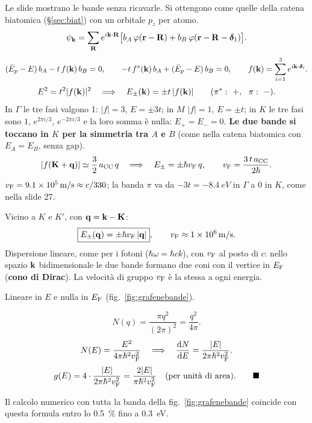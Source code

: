 \documentclass[11pt,a4paper]{article}
\begin{document}
\begin{approfondimento}
Le slide mostrano le bande senza ricavarle. Si ottengono come quelle della catena biatomica (§\ref{sec:biat}) con un orbitale $p_z$ per atomo.
\[ \psi_{\mathbf k}=\sum_{\mathbf R}e^{i\mathbf k\cdot\mathbf R}\bigl[b_A\,\varphi(\mathbf r-\mathbf R)+b_B\,\varphi(\mathbf r-\mathbf R-\bm\delta_1)\bigr]. \]
\[ (\bar E_p-E)\,b_A-t\,f(\mathbf k)\,b_B=0,\qquad -t\,f^*(\mathbf k)\,b_A+(\bar E_p-E)\,b_B=0,\qquad f(\mathbf k)=\sum_{i=1}^3e^{i\mathbf k\cdot\bm\delta_i}. \]
\[ E^2=t^2|f(\mathbf k)|^2\quad\Longrightarrow\quad E_\pm(\mathbf k)=\pm t\,|f(\mathbf k)|\qquad(\pi^*:\ +,\ \ \pi:\ -). \]
In $\Gamma$ le tre fasi valgono 1: $|f|=3$, $E=\pm3t$; in $M$ $|f|=1$, $E=\pm t$; in $K$ le tre fasi sono $1$, $e^{2\pi i/3}$, $e^{-2\pi i/3}$ e la loro
somma è nulla: $E_+=E_-=0$. \textbf{Le due bande si toccano in $K$ per la simmetria tra $A$ e $B$} (come nella catena biatomica con $E_A=E_B$, senza gap).
\[ |f(\mathbf K+\mathbf q)|\simeq\frac32\,a_{\mathrm{CC}}\,q\quad\Longrightarrow\quad E_\pm=\pm\hbar v_{\mathrm F}\,q,\qquad v_{\mathrm F}=\frac{3\,t\,a_{\mathrm{CC}}}{2\hbar}. \]
$v_{\mathrm F}=\SI{9.1e5}{m/s}\approx c/330$; la banda $\pi$ va da $-3t=\SI{-8.4}{eV}$ in $\Gamma$ a $0$ in $K$, come nella slide 27.
\end{approfondimento}

\begin{chiave}
Vicino a $K$ e $K'$, con $\mathbf q=\mathbf k-\mathbf K$:
\[ \boxed{E_\pm(\mathbf q)=\pm\hbar v_{\mathrm F}\,|\mathbf q|},\qquad v_{\mathrm F}\approx\SI{1e6}{m/s}. \]
Dispersione lineare, come per i fotoni ($\hbar\omega=\hbar ck$), con $v_{\mathrm F}$ al posto di $c$: nello spazio $\mathbf k$ bidimensionale le due bande formano due coni
con il vertice in $E_{\mathrm F}$ (\textbf{cono di Dirac}). La velocità di gruppo $v_{\mathrm F}$ è la stessa a ogni energia.
\end{chiave}

Lineare in $E$ e nulla in $E_{\mathrm F}$ (fig.~\ref{fig:grafenebande}).
\begin{dimostrazione}
\[ N(q)=\frac{\pi q^2}{(2\pi)^2}=\frac{q^2}{4\pi}. \]
\[ N(E)=\frac{E^2}{4\pi\hbar^2v_{\mathrm F}^2}\quad\Longrightarrow\quad\frac{\mathrm d N}{\mathrm d E}=\frac{|E|}{2\pi\hbar^2v_{\mathrm F}^2}. \]
\[ g(E)=4\cdot\frac{|E|}{2\pi\hbar^2\vF^2}=\frac{2|E|}{\pi\hbar^2\vF^2}\quad(\text{per unità di area}).\qed \]
\end{dimostrazione}
Il calcolo numerico con tutta la banda della fig.~\ref{fig:grafenebande} coincide con questa formula entro lo \SI{0.5}{\percent} fino a \SI{0.3}{eV}.
\end{document}
